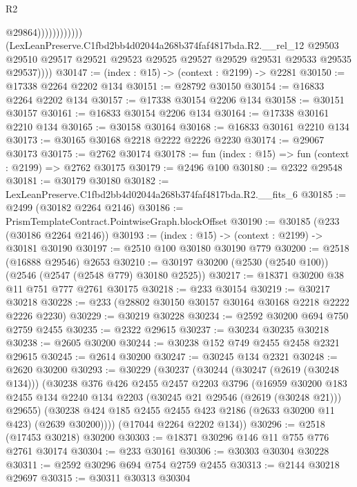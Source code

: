 \begin{lexlean}{R2}
\begin{coremodule}
                                  @29864))))))))))))
          (LexLeanPreserve.C1fbd2bb4d02044a268b374faf4817bda.R2.__rel_12
            @29503
            @29510
            @29517
            @29521
            @29523
            @29525
            @29527
            @29529
            @29531
            @29533
            @29535
            @29537))))
@30147 := (index : @15) -> (context : @2199) -> @2281
@30150 := @17338 @2264 @2202 @134
@30151 := @28792 @30150
@30154 := @16833 @2264 @2202 @134
@30157 := @17338 @30154 @2206 @134
@30158 := @30151 @30157
@30161 := @16833 @30154 @2206 @134
@30164 := @17338 @30161 @2210 @134
@30165 := @30158 @30164
@30168 := @16833 @30161 @2210 @134
@30173 := @30165 @30168 @2218 @2222 @2226 @2230
@30174 := @29067 @30173
@30175 := @2762 @30174
@30178 := fun (index : @15) => fun (context : @2199) => @2762 @30175
@30179 := @2496 @100
@30180 := @2322 @29548
@30181 := @30179 @30180
@30182 := LexLeanPreserve.C1fbd2bb4d02044a268b374faf4817bda.R2.__fits_6
@30185 := @2499 (@30182 @2264 @2146)
@30186 := PrismTemplateContract.PointwiseGraph.blockOffset
@30190 := @30185 (@233 (@30186 @2264 @2146))
@30193 := (index : @15) -> (context : @2199) -> @30181 @30190
@30197 := @2510 @100 @30180 @30190 @779
@30200 := @2518 (@16888 @29546) @2653
@30210 := @30197 @30200 (@2530 (@2540 @100)) (@2546 (@2547 (@2548 @779) @30180 @2525))
@30217 := @18371 @30200 @38 @11 @751 @777 @2761 @30175
@30218 := @233 @30154
@30219 := @30217 @30218
@30228 := @233 (@28802 @30150 @30157 @30164 @30168 @2218 @2222 @2226 @2230)
@30229 := @30219 @30228
@30234 := @2592 @30200 @694 @750 @2759 @2455
@30235 := @2322 @29615
@30237 := @30234 @30235 @30218
@30238 := @2605 @30200
@30244 := @30238 @152 @749 @2455 @2458 @2321 @29615
@30245 := @2614 @30200
@30247 := @30245 @134 @2321
@30248 := @2620 @30200
@30293 := @30229
    (@30237
      (@30244
        (@30247 (@2619 (@30248 @134)))
        (@30238
          @376
          @426
          @2455
          @2457
          @2203
          @3796
          (@16959
            @30200
            @183
            @2455
            @134
            @2240
            @134
            @2203
            (@30245 @21 @29546 (@2619 (@30248 @21)))
            @29655)
          (@30238 @424 @185 @2455 @2455 @423 @2186 (@2633 @30200 @11 @423) (@2639 @30200))))
      (@17044 @2264 @2202 @134))
@30296 := @2518 (@17453 @30218) @30200
@30303 := @18371 @30296 @146 @11 @755 @776 @2761 @30174
@30304 := @233 @30161
@30306 := @30303 @30304 @30228
@30311 := @2592 @30296 @694 @754 @2759 @2455
@30313 := @2144 @30218 @29697
@30315 := @30311 @30313 @30304

\end{coremodule}
\end{lexlean}
